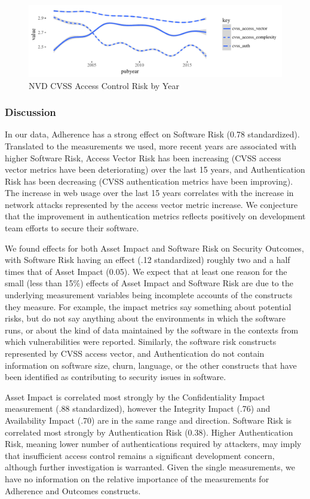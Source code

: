 \begin{figure}
	\centering
	\includegraphics[width=\columnwidth]{nvd_cvss_auth}
	\caption{NVD CVSS Access Control Risk by Year}
	\label{fig:nvd_vulns_auth}
\end{figure}
\subsubsection{Discussion}
\label{sec:case_nvd_discussion}
In our data, Adherence has a strong effect on Software Risk (0.78 standardized). Translated to the measurements we used, more recent years are associated with higher Software Risk, Access Vector Risk has been increasing (CVSS access vector metrics have been deteriorating) over the last 15 years, and Authentication Risk has been decreasing (CVSS authentication metrics have been improving). The increase in web usage over the last 15 years correlates with the increase in network attacks represented by the access vector metric increase. We conjecture that the improvement in authentication metrics reflects positively on development team efforts to secure their software.  
 
We found effects for both Asset Impact and Software Risk on Security Outcomes, with Software Risk having an effect (.12 standardized) roughly two and a half times that of Asset Impact (0.05). We expect that at least one reason for the small (less than 15\%) effects of Asset Impact and Software Risk are due to the underlying measurement variables being incomplete accounts of the constructs they measure. For example, the impact metrics say something about potential risks, but do not say anything about the environments in which the software runs, or about the kind of data maintained by the software in the contexts from which vulnerabilities were reported. Similarly, the software risk constructs represented by CVSS access vector, and Authentication do not contain information on software size, churn, language, or the other constructs that have been identified as contributing to security issues in software. 

Asset Impact is correlated most strongly by the Confidentiality Impact measurement (.88 standardized), however the Integrity Impact (.76) and Availability Impact (.70) are in the same range and direction. Software Risk is correlated most strongly by Authentication Risk (0.38). Higher Authentication Risk, meaning lower number of authentications required by attackers, may imply that insufficient access control remains a significant development concern, although further investigation is warranted. Given the single measurements, we have no information on the relative importance of the measurements for Adherence and Outcomes constructs.

